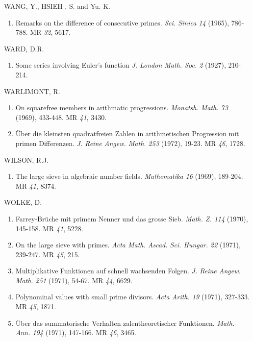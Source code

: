 \begin{thebibliography}{99}
 WANG, Y., HSIEH , S. and Yu. K. 
\begin{enumerate}
\item Remarks on the difference of consecutive
  primes. \textit{Sci. Sinica 14} (1965), 786-788. MR {\em 32}, 5617.
\end{enumerate}

 WARD, D.R.
\begin{enumerate}
\item Some series involving Euler's function \textit{J. London
  Math. Soc. 2} (1927), 210-214.
\end{enumerate}

 WARLIMONT, R.
\begin{enumerate}
\item On squarefree members in arithmatic
  progressions. \textit{Monatsh. Math. 73} (1969), 433-448. MR
  {\em 41}, 3430. 

\item \"{U}ber die kleinsten quadratfreien Zahlen in arithmetischen
  Progression mit primen Differenzen. \textit{J. Reine Angew. Math.
  253} (1972), 19-23. MR {\em 46}, 1728.	 
\end{enumerate}

 WILSON, R.J.
\begin{enumerate}
\item The large sieve in algebraic number fields. \textit{Mathematika
  16} (1969), 189-204. MR {\em 41}, 8374.
\end{enumerate}

 WOLKE, D.
\begin{enumerate}
\item Farrey-Br\={u}che mit primem Nenner und das grosse
  Sieb. \textit{Math. Z. 114} (1970), 145-158. MR {\em 41}, 5228.

\item On the large sieve with primes. \textit{Acta
  Math. Ascad. Sci. Hungar. 22} (1971), 239-247. MR {\em 45}, 215.

\item Multiplikative Funktionen auf schnell wachsenden
  Folgen. \textit{J. Reine Angew. Math. 251} (1971), 54-67. MR {\em 44},
  6629.

\item Polynominal values with small prime divisors. \textit{Acta Arith.
19} (1971), 327-333. MR {\em 45}, 1871.

\item \"{U}ber das summatorische Verhalten zalentheoretischer
  Funktionen. \textit{Math. Ann. 194} (1971), 147-166. MR {\em 46}, 3465.


\end{enumerate}
\end{thebibliography}
